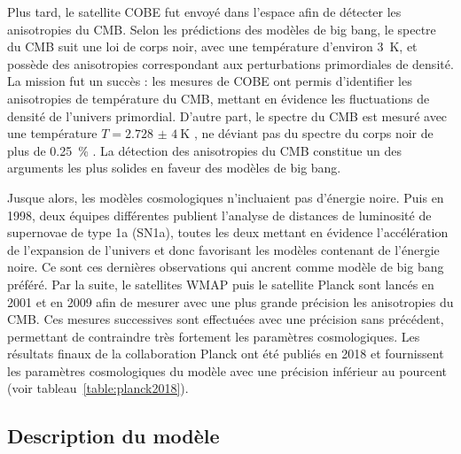 Plus tard, le satellite COBE fut envoyé dans l'espace afin de détecter les anisotropies du CMB. Selon les prédictions des modèles de big bang, le spectre du CMB suit une loi de corps noir, avec une température d'environ \SI{3}{\kelvin}, et possède des anisotropies correspondant aux perturbations primordiales de densité. La mission fut un succès : les mesures de COBE ont permis d'identifier les anisotropies de température du CMB, mettant en évidence les fluctuations de densité de l'univers primordial. D'autre part, le spectre du CMB est mesuré avec une température $T = \SI{2,728(4)}{\kelvin}$ \autocite{Fixsen1996}, ne déviant pas du spectre du corps noir de plus de \SI{0,25}{\percent} \autocite{Bennett1993}. La détection des anisotropies du CMB constitue un des arguments les plus solides en faveur des modèles de big bang.

Jusque alors, les modèles cosmologiques n'incluaient pas d'énergie noire. Puis en 1998, deux équipes différentes publient l'analyse de distances de luminosité de supernovae de type 1a (SN1a), toutes les deux mettant en évidence l'accélération de l'expansion de l'univers et donc favorisant les modèles contenant de l'énergie noire. Ce sont ces dernières observations qui ancrent \lcdm{} comme modèle de big bang préféré. Par la suite, le satellites WMAP puis le satellite Planck sont lancés en 2001 et en 2009 afin de mesurer avec une plus grande précision les anisotropies du CMB. Ces mesures successives sont effectuées avec une précision sans précédent, permettant de contraindre très fortement les paramètres cosmologiques. Les résultats finaux de la collaboration Planck ont été publiés en 2018 \autocite{Collaboration2018} et fournissent les paramètres cosmologiques du modèle \lcdm{} avec une précision inférieur au pourcent (voir tableau~\ref{table:planck2018}).

\subsection{Description du modèle}
\label{subsec:descri_mod}

